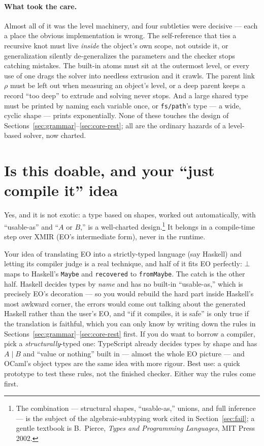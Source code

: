\documentclass[10pt]{article}
\begin{document}
\paragraph{What took the care.} Almost all of it was the level machinery, and
four subtleties were decisive --- each a place the obvious implementation is
wrong. The self-reference that ties a recursive knot must live \emph{inside} the
object's own scope, not outside it, or generalization silently de-generalizes the
parameters and the checker stops catching mistakes. The built-in atoms must sit
at the outermost level, or every use of one drags the solver into needless
extrusion and it crawls. The parent link $\rho$ must be left out when measuring
an object's level, or a deep parent keeps a record ``too deep'' to extrude and
solving never stops. And a large shared type must be printed by naming each
variable once, or \verb|fs/path|'s type --- a wide, cyclic shape --- prints
exponentially. None of these touches the design of
Sections~\ref{sec:grammar}--\ref{sec:core-rest}; all are the ordinary hazards of
a level-based solver, now charted.

\section{Is this doable, and your ``just compile it'' idea}

Yes, and it is not exotic: a type based on shapes, worked out automatically,
with ``usable-as'' and ``$A$ or $B$,'' is a well-charted design.\footnote{The
combination --- structural shapes, ``usable-as,'' unions, and full inference ---
is the subject of the algebraic-subtyping work cited in Section~\ref{sec:fail}; a gentle
textbook is B.~Pierce, \emph{Types and Programming Languages}, MIT Press 2002.}
It belongs in a compile-time step over XMIR (EO's intermediate form), never in
the runtime.

Your idea of translating EO into a strictly-typed language (say Haskell) and
letting its compiler judge is a real technique, and half of it fits EO
perfectly: $\bot$ maps to Haskell's \texttt{Maybe} and \verb|recovered| to
\texttt{fromMaybe}. The catch is the other half. Haskell decides types by
\emph{name} and has no built-in ``usable-as,'' which is precisely EO's
decoration --- so you would rebuild the hard part inside Haskell's most awkward
corner, the errors would come out talking about the generated Haskell rather
than the user's EO, and ``if it compiles, it is safe'' is only true if the
translation is faithful, which you can only know by writing down the rules in
Sections~\ref{sec:grammar}--\ref{sec:core-rest} first. If you do want to borrow a compiler, pick a
\emph{structurally}-typed one: TypeScript already decides types by shape and has
$A\mid B$ and ``value or nothing'' built in --- almost the whole EO picture ---
and OCaml's object types are the same idea with more rigour. Best use: a quick
prototype to test these rules, not the finished checker. Either way the rules
come first.
\end{document}
